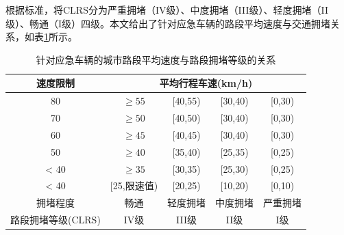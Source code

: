 根据标准\cite{GA_T_115_2020}，将CLRS分为严重拥堵（IV级）、中度拥堵（III级）、轻度拥堵（II级）、畅通（I级）四级。本文给出了针对应急车辆的路段平均速度与交通拥堵关系，如表\ref{table:CLRS}所示。


\begin{table}[H]
	\centering  %
	\caption{针对应急车辆的城市路段平均速度与路段拥堵等级的关系}  %
	\label{table:CLRS}  %
	\begin{tabular}{|c|cccc|}  
		\hline  
		速度限制 & \multicolumn{4}{c}{ 平均行程车速(km/h)} \vline \\  %
		\hline
		80 & ${\geq{55}}$ & {[}40,55) & {[}30,40) & {[}0,30) \\ 
		\hline
		70 & ${\geq{50}}$ & {[}40,50) & {[}30,40) & {[}0,30) \\ 
		\hline
		60 & ${\geq{45}}$ & {[}40,45) & {[}30,40) & {[}0,30) \\ 
		\hline
		50 & ${\geq{40}}$ & {[}35,40) & {[}25,35) & {[}0,25) \\ 
		\hline
		< 40 & ${\geq{35}}$ & {[}30,35) & {[}25,30) & {[}0,25) \\ 
		\hline
		< 40 & {[}25,限速值) & {[}20,25) & {[}10,20) & {[}0,10) \\
		\hline
		拥堵程度 & 畅通 & 轻度拥堵 & 中度拥堵 & 严重拥堵 \\
		\hline
		路段拥堵等级(CLRS) & IV级 & III级 & II级 & I级 \\
		\hline
	\end{tabular}
\end{table}


